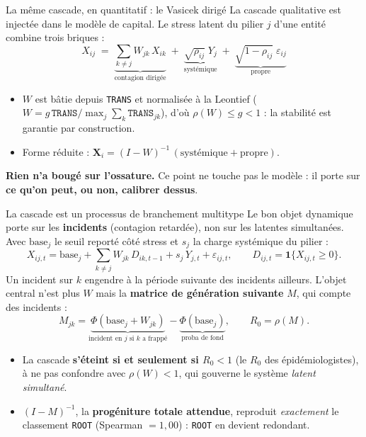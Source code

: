 \documentclass[11pt]{beamer}
\begin{document}
\begin{frame}{La même cascade, en quantitatif : le Vasicek dirigé}
La cascade qualitative est injectée dans le modèle de capital. Le stress latent du pilier
$j$ d'une entité combine trois briques :
\[
X_{ij} \;=\; \underbrace{\sum_{k\neq j} W_{jk}\,X_{ik}}_{\text{contagion dirigée}}
   \;+\; \underbrace{\sqrt{\rho_{ij}}\;Y_j}_{\text{systémique}}
   \;+\; \underbrace{\sqrt{1-\rho_{ij}}\;\varepsilon_{ij}}_{\text{propre}}
\]
\begin{itemize}
\item $W$ est bâtie depuis \texttt{TRANS} et normalisée à la Leontief
      ($W = g\,\texttt{TRANS}/\max_j \sum_k \texttt{TRANS}_{jk}$), d'où $\rho(W)\le g<1$ :
      la stabilité est garantie par construction.
\item Forme réduite : $\mathbf{X}_i = (I-W)^{-1}\,(\text{systémique} + \text{propre})$.
\end{itemize}
\vfill
\textbf{Rien n'a bougé sur l'ossature.} Ce point ne touche pas le modèle : il porte sur
\textbf{ce qu'on peut, ou non, calibrer dessus}.
\end{frame}

\begin{frame}{La cascade est un processus de branchement multitype}
\small
Le bon objet dynamique porte sur les \textbf{incidents} (contagion retardée), non sur les
latentes simultanées. Avec $\text{base}_j$ le seuil reporté côté stress et $s_j$ la charge
systémique du pilier :
\[
X_{ij,t} = \text{base}_j + \sum_{k\neq j} W_{jk}\,D_{ik,t-1} + s_j\,Y_{j,t}
           + \varepsilon_{ij,t},
\qquad D_{ij,t} = \mathbf 1\{X_{ij,t} \ge 0\}.
\]
Un incident sur $k$ engendre à la période suivante des incidents ailleurs. L'objet central
n'est plus $W$ mais la \textbf{matrice de génération suivante} $M$, qui compte des
incidents :
\[
M_{jk} = \underbrace{\Phi(\text{base}_j + W_{jk})}_{\text{incident en } j \text{ si } k \text{ a frappé}}
       - \underbrace{\Phi(\text{base}_j)}_{\text{proba de fond}},
\qquad R_0 = \rho(M).
\]
\begin{itemize}
\item La cascade \textbf{s'éteint si et seulement si $R_0 < 1$} (le $R_0$ des
      épidémiologistes), à ne pas confondre avec $\rho(W)<1$, qui gouverne le système
      \emph{latent simultané}.
\item $(I-M)^{-1}$, la \textbf{progéniture totale attendue}, reproduit \emph{exactement} le
      classement \texttt{ROOT} (Spearman $=1{,}00$) : \texttt{ROOT} en devient redondant.
\end{itemize}
\end{frame}
\end{document}

